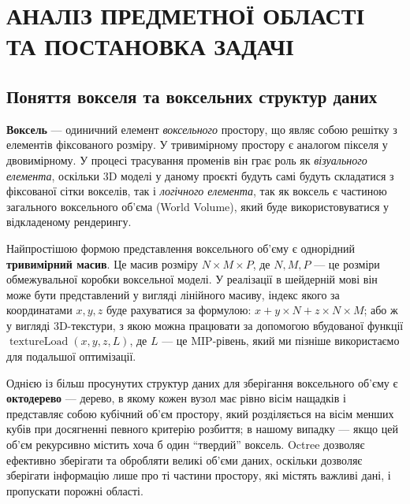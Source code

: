 \chapter{АНАЛІЗ ПРЕДМЕТНОЇ ОБЛАСТІ\\ТА ПОСТАНОВКА ЗАДАЧІ}

\section{Поняття вокселя та воксельних структур даних}

\textbf{Воксель}  --- одиничний елемент \textit{воксельного} простору, що являє собою решітку з елементів фіксованого розміру. У тривимірному простору є аналогом пікселя у двовимірному. У процесі трасування променів він грає роль як \textit{візуального елемента}, оскільки 3D моделі у даному проєкті будуть самі будуть складатися з фіксованої сітки вокселів, так і \textit{логічного елемента}, так як воксель є частиною загального воксельного об'єма (World Volume), який буде використовуватися у відкладеному рендерингу. \cite{wiki:voxel}

\begin{figure}[ht]
    \centering
    
    \caption{}
    \label{fig:voxel}
\end{figure}

Найпростішою формою представлення воксельного об'єму є однорідний \textbf{тривимірний масив}. Це масив розміру $N \times M \times P$, де $N, M, P$ --- це розміри обмежувальної коробки воксельної моделі. У реалізації в шейдерній мові він може бути представлений у вигляді лінійного масиву, індекс якого за координатами $x, y, z$ буде рахуватися за формулою: $x + y \times N + z \times N \times M$; або ж у вигляді 3D-текстури, з якою можна працювати за допомогою вбудованої функції $\operatorname{textureLoad}(x, y, z, L)$, де $L$ --- це MIP-рівень, який ми пізніше використаємо для подальшої оптимізації. 

Однією із більш просунутих структур даних для зберігання воксельного об'є\-му є \textbf{октодерево}  --- дерево, в якому кожен вузол має рівно вісім нащадків і представляє собою кубічний об'єм простору, який розділяється на вісім менших кубів при досягненні певного критерію розбиття; в нашому випадку --- якщо цей об'єм рекурсивно містить хоча б один ``твердий'' воксель. Octree дозволяє ефективно зберігати та обробляти великі об'єми даних, оскільки дозволяє зберігати інформацію лише про ті частини простору, які містять важливі дані, і пропускати порожні області. \cite{sparseOctrees}


